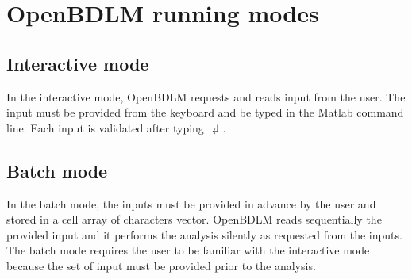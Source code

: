 \section{OpenBDLM running modes}
\label{S:OPENBDLMRUNNINGMODES}

\subsection{Interactive mode}
\label{SS:InteractiveMode}

In the interactive mode, OpenBDLM requests and reads input from the user.
The input must be provided from the keyboard and be typed in the Matlab command line.
Each input is validated after typing $\dlsh$.

\subsection{Batch mode}
\label{SS:Batchmode}

In the batch mode, the inputs must be provided in advance by the user and stored in a cell array of characters vector.
OpenBDLM reads sequentially the provided input and it performs the analysis silently as requested from the inputs.
The batch mode requires the user to be familiar with the interactive mode because the set of input must be provided prior to the analysis.